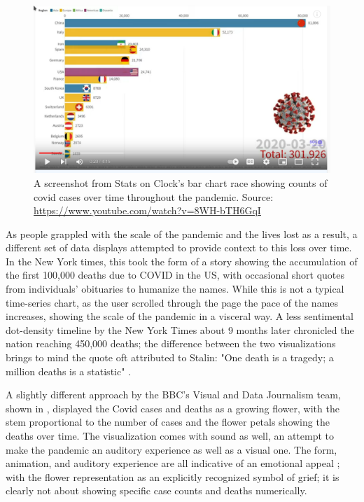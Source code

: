 \documentclass[article]{jdssv}\usepackage[]{graphicx}\usepackage[]{xcolor}
\begin{document}
\begin{figure}
\centering
\includegraphics[width=.8\linewidth]{Figures_Web/Bar-chart-race-screenshot}
\caption{A screenshot from Stats on Clock's bar chart race showing counts of covid cases over time throughout the pandemic. Source: \url{https://www.youtube.com/watch?v=8WH-bTH6GqI}}\label{fig:barchart-race}
\end{figure}

As people grappled with the scale of the pandemic and the lives lost as a result, a different set of data displays attempted to provide context to this loss over time. In the New York times, this took the form of a story showing the accumulation of the first 100,000 deaths due to COVID in the US, with occasional short quotes from individuals' obituaries to humanize the names\citep{barryRemembering1000002020}. While this is not a typical time-series chart, as the user scrolled through the page the pace of the names increases, showing the scale of the pandemic in a visceral way. A less sentimental dot-density timeline by the New York Times about 9 months later chronicled the nation reaching 450,000 deaths; the difference between the two visualizations brings to mind the quote oft attributed to Stalin: "One death is a tragedy; a million deaths is a statistic" \citep{investigatorSingleDeathTragedy2016}.

A slightly different approach by the BBC's Visual and Data Journalism team, shown in , displayed the Covid cases and deaths as a growing flower, with the stem proportional to the number of cases and the flower petals showing the deaths over time\citep{thebbcvisualanddatajournalismteamCoronavirusHowCan2020}. The visualization comes with sound as well, an attempt to make the pandemic an auditory experience as well as a visual one. The form, animation, and auditory experience are all indicative of an emotional appeal \citep{kostelnick_re-emergence_2016,dignazio_data_2020}; with the flower representation as an explicitly recognized symbol of grief; it is clearly not about showing specific case counts and deaths numerically.
\end{document}

